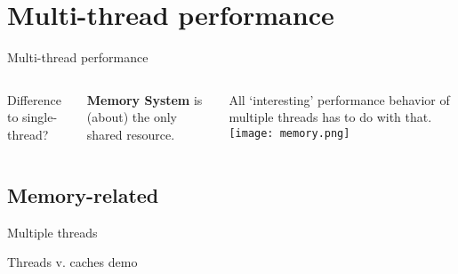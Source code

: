 \documentclass[english,compress]{beamer}
\begin{document}
\section{Multi-thread performance}
\begin{frame}{Multi-thread performance}
  \begin{columns}

      Difference to single-thread?
      \pause

      \bigskip
      \textbf{Memory System} is (about) the only shared resource.

      \bigskip
      All `interesting' performance behavior of multiple threads
      has to do with that.
      \texttt{[image: memory.png]}
  \end{columns}
\end{frame}
\subsection{Memory-related}
\begin{frame}{Multiple threads}
  \begin{center}
  \Huge Threads v. caches demo
  \end{center}
\end{frame}

\questionframe{}
\imagecreditslide
\end{document}
